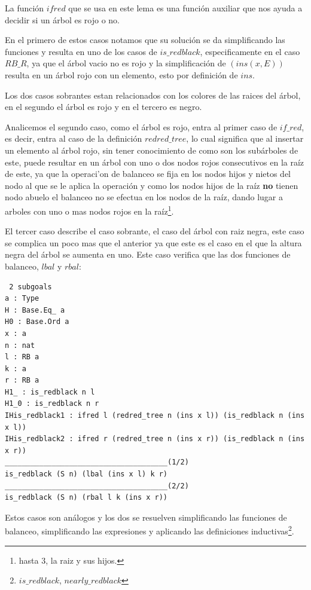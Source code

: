 \documentclass[8pt,leqno,pdflatex,spanish]{book}
\theoremstyle{plain}
\theoremstyle{definition}
\theoremstyle{remark}
\begin{document}
La funci\'on $ifred$ que se usa en este lema es una funci\'on auxiliar que nos ayuda a decidir si 
un \'arbol es rojo o no. 

En el primero de estos casos notamos que su soluci\'on se da simplificando las funciones y resulta 
en uno de los casos de $is\_redblack$, especificamente en el caso $RB\_R$, ya que el \'arbol vacio 
no es rojo y la simplificaci\'on de $(ins(x,E))$ resulta en un \'arbol rojo con un elemento, esto 
por definici\'on de $ins$.

Los dos casos sobrantes estan relacionados con los colores de las raices del \'arbol, en el 
segundo el \'arbol es rojo y en el tercero es negro. 
 
Analicemos el segundo caso, como el \'arbol es rojo, entra al primer caso de $if\_red$, es decir, 
entra al caso de la definici\'on $redred\_tree$, lo cual significa que al insertar un elemento al 
\'arbol rojo, sin tener conocimiento de como son los subárboles de este, puede resultar en un 
\'arbol con uno o dos nodos rojos consecutivos en la ra\'iz de este, ya que la operaci'on de 
balanceo se fija en los nodos hijos y nietos del nodo al que se le aplica la operaci\'on y como 
los nodos hijos de la raíz \textbf{no} tienen nodo abuelo el balanceo no se efectua en los nodos 
de la raíz, dando lugar a arboles con uno o mas nodos rojos en la raíz\footnote{hasta 3, la raiz y 
sus hijos.}.
 
El tercer caso describe el caso sobrante, el caso del \'arbol con raiz negra, este caso se 
complica un poco mas que el anterior ya que este es el caso en el que la altura negra del \'arbol 
se aumenta en uno. Este caso verifica que las dos funciones de balanceo, $lbal$ y $rbal$:
 
\begin{verbatim}
 2 subgoals
a : Type
H : Base.Eq_ a
H0 : Base.Ord a
x : a
n : nat
l : RB a
k : a
r : RB a
H1_ : is_redblack n l
H1_0 : is_redblack n r
IHis_redblack1 : ifred l (redred_tree n (ins x l)) (is_redblack n (ins x l))
IHis_redblack2 : ifred r (redred_tree n (ins x r)) (is_redblack n (ins x r))
______________________________________(1/2)
is_redblack (S n) (lbal (ins x l) k r)
______________________________________(2/2)
is_redblack (S n) (rbal l k (ins x r))
\end{verbatim}

Estos casos son análogos y los dos se resuelven simplificando las funciones de balanceo, 
simplificando las expresiones y aplicando las definiciones inductivas\footnote{$is\_redblack$, 
$nearly\_redblack$}.
\end{document}
